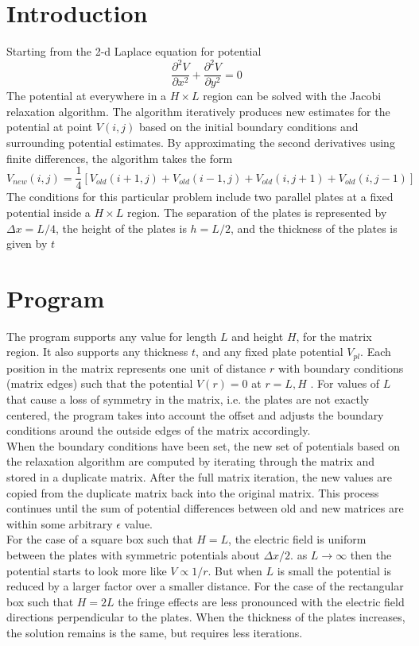 \documentclass[10pt,a4paper]{article}
\begin{document}
\section{Introduction}
Starting from the 2-d Laplace equation for potential
\begin{equation}
\frac{\partial^2 V}{\partial x^2} + \frac{\partial^2 V}{\partial y^2} = 0
\end{equation}
The potential at everywhere in a $H \times L$ region can be solved with the Jacobi relaxation algorithm.  The algorithm iteratively produces new estimates for the potential at point $V(i,j)$ based on the initial boundary conditions and surrounding potential estimates. By approximating the second derivatives using finite differences, the algorithm takes the form 
\begin{equation}
	V_{new}(i,j) = \frac{1}{4} [ V_{old}(i+1,j)+V_{old}(i-1,j)+V_{old}(i,j+1)+V_{old}(i,j-1) ]
\end{equation}
The conditions for this particular problem include two parallel plates at a fixed potential inside a $H \times L$ region. The separation of the plates is represented by $\Delta x = L/4$, the height of the plates is $h= L/2$, and the thickness of the plates is given by $t$

\section{Program}
The program supports any value for length $L$ and height $H$, for the matrix region. It also supports any thickness $t$, and any fixed plate potential $V_{pl}$. Each position in the matrix represents one unit of distance $r$ with boundary conditions (matrix edges) such that the potential $V(r) = 0$ at $r=L,H$ . For values of $L$ that cause a loss of symmetry in the matrix, i.e. the plates are not exactly centered, the program takes into account the offset and adjusts the boundary conditions around the outside edges of the matrix accordingly.  \\
When the boundary conditions have been set, the new set of potentials based on the relaxation algorithm are computed by iterating through the matrix and stored in a duplicate matrix. After the full matrix iteration, the new values are copied from the duplicate matrix back into the original matrix.  This process continues until the sum of potential differences between old and new matrices are within some arbitrary $\epsilon$ value.\\
For the case of a square box such that $H=L$, the electric field is uniform between the plates with symmetric potentials about $\Delta x /2.$ as $L \rightarrow \infty$ then the potential starts to look more like $V \propto 1/r$. But when $L$ is small the potential is reduced by a larger factor over a smaller distance.  For the case of the rectangular box such that $H =2L$ the fringe effects are less pronounced with the electric field directions perpendicular to the plates.  When the thickness of the plates increases, the solution remains is the same, but requires less iterations.
\end{document}
